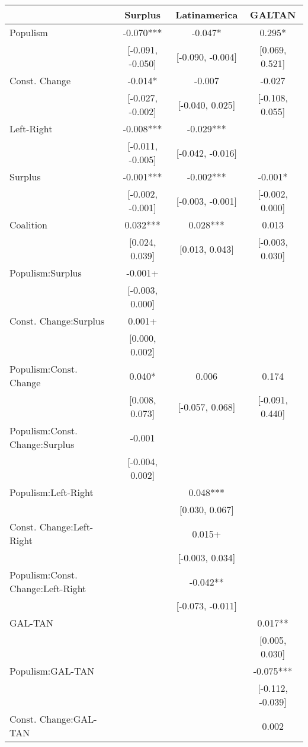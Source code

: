 \begin{table}
\centering\centering\centering
\begin{tabular}[t]{lccc}
\toprule
  & Surplus & Latinamerica & GALTAN\\
\midrule
Populism & -0.070*** & -0.047* & 0.295*\\
 & {}[-0.091, -0.050] & {}[-0.090, -0.004] & {}[0.069, 0.521]\\
Const. Change & -0.014* & -0.007 & -0.027\\
 & {}[-0.027, -0.002] & {}[-0.040, 0.025] & {}[-0.108, 0.055]\\
Left-Right & -0.008*** & -0.029*** & \\
 & {}[-0.011, -0.005] & {}[-0.042, -0.016] & \\
Surplus & -0.001*** & -0.002*** & -0.001*\\
 & {}[-0.002, -0.001] & {}[-0.003, -0.001] & {}[-0.002, 0.000]\\
Coalition & 0.032*** & 0.028*** & 0.013\\
 & {}[0.024, 0.039] & {}[0.013, 0.043] & {}[-0.003, 0.030]\\
Populism:Surplus & -0.001+ &  & \\
 & {}[-0.003, 0.000] &  & \\
Const. Change:Surplus & 0.001+ &  & \\
 & {}[0.000, 0.002] &  & \\
Populism:Const. Change & 0.040* & 0.006 & 0.174\\
 & {}[0.008, 0.073] & {}[-0.057, 0.068] & {}[-0.091, 0.440]\\
Populism:Const. Change:Surplus & -0.001 &  & \\
 & {}[-0.004, 0.002] &  & \\
Populism:Left-Right &  & 0.048*** & \\
 &  & {}[0.030, 0.067] & \\
Const. Change:Left-Right &  & 0.015+ & \\
 &  & {}[-0.003, 0.034] & \\
Populism:Const. Change:Left-Right &  & -0.042** & \\
 &  & {}[-0.073, -0.011] & \\
GAL-TAN &  &  & 0.017**\\
 &  &  & {}[0.005, 0.030]\\
Populism:GAL-TAN &  &  & -0.075***\\
 &  &  & {}[-0.112, -0.039]\\
Const. Change:GAL-TAN &  &  & 0.002\\

\end{tabular}
\end{table}
